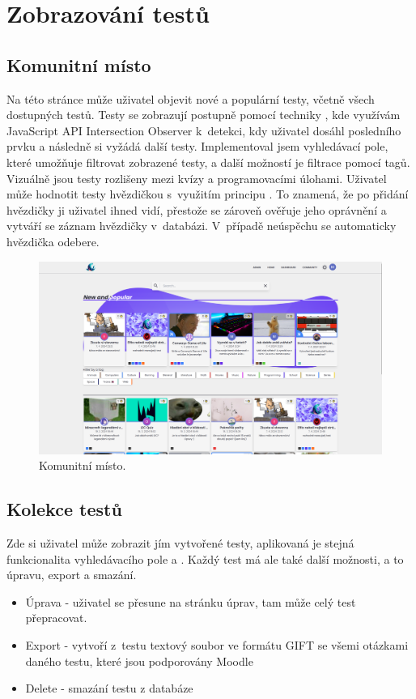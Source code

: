 \documentclass[12pt, a4paper,
openright
]{report}
\begin{document}
\clearpage
\section{Zobrazování testů}

\subsection{Komunitní místo}
\label{subsec:community}
Na této stránce může uživatel objevit nové a populární testy, včetně všech dostupných testů. Testy se zobrazují postupně pomocí techniky , kde využívám JavaScript API Intersection Observer k~detekci, kdy uživatel dosáhl posledního prvku a následně si vyžádá další testy. Implementoval jsem vyhledávací pole, které umožňuje filtrovat zobrazené testy, a další možností je filtrace pomocí tagů. Vizuálně jsou testy rozlišeny mezi kvízy a programovacími úlohami. Uživatel může hodnotit testy hvězdičkou s~využitím principu . To znamená, že po přidání hvězdičky ji uživatel ihned vidí, přestože se zároveň ověřuje jeho oprávnění a vytváří se záznam hvězdičky v~databázi. V~případě neúspěchu se automaticky hvězdička odebere.

\begin{figure}[H]
	\centering %
	\includegraphics[width=1\linewidth]{image/community.png} 
	\caption{Komunitní místo.} %
	\label{fig:community} %
\end{figure}


\subsection{Kolekce testů}
\label{subsec:collection}
Zde si uživatel může zobrazit jím vytvořené testy, aplikovaná je stejná funkcionalita vyhledávacího pole a . Každý test má ale také další možnosti, a to úpravu, export a smazání.
\begin{itemize}
	\item Úprava - uživatel se přesune na stránku úprav, tam může celý test přepracovat.
	\item Export - vytvoří z~testu textový soubor ve formátu GIFT se všemi otázkami daného testu, které jsou podporovány Moodle
	\item Delete - smazání testu z databáze
\end{itemize}
\end{document}
